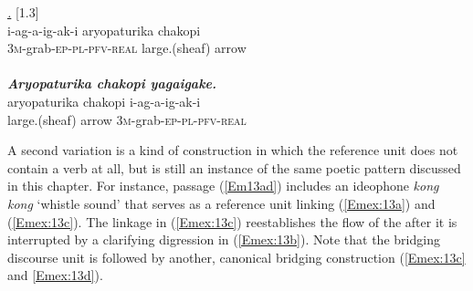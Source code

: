 \documentclass[output=paper]{LSP/langsci}
\begin{document}
\begin{exe}
\ex \label{Em12ab}
\begin{xlist}
\ex \label{Emex:12a}
\glt \textit{ \underline{.}} [1.3]\\
\gll i-ag-a-ig-ak-i aryopaturika chakopi\\
 \textsc{3m-}grab\textsc{-ep-pl-pfv-real} large.(sheaf) arrow\\
\glt {}\\
\ex \label{Emex:12b}
\glt \textit{\textbf{Aryopaturika chakopi yagaigake.}}\\
\gll aryopaturika chakopi i-ag-a-ig-ak-i \\     	      
   large.(sheaf) arrow \textsc{3m-}grab\textsc{-ep-pl-pfv-real}\\
\glt {}
\end{xlist}
\end{exe}

A second variation is a kind of construction in which the reference unit does not contain a verb at all, but is still an instance of the same poetic pattern discussed in this chapter. For instance, passage (\ref{Em13ad}) includes an ideophone \textit{kong kong} `whistle sound' that serves as a reference unit linking (\ref{Emex:13a}) and (\ref{Emex:13c}). The linkage in (\ref{Emex:13c}) reestablishes the flow of the  after it is interrupted by a clarifying digression in (\ref{Emex:13b}). Note that the bridging discourse unit is followed by another, canonical bridging construction (\ref{Emex:13c} and \ref{Emex:13d}).
\end{document}
